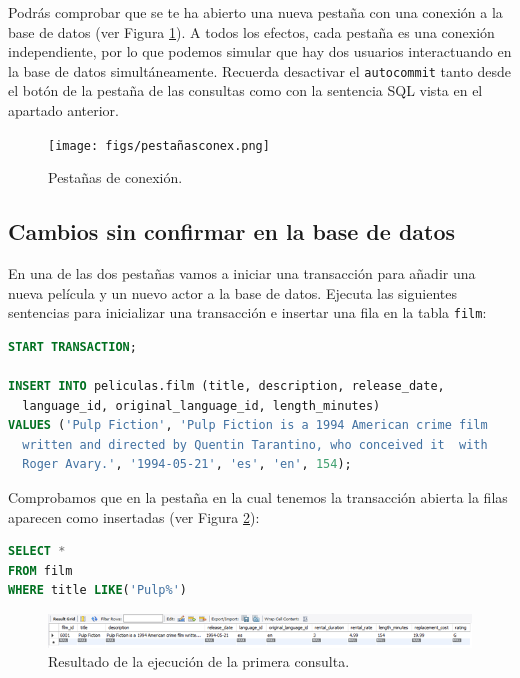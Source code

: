 \documentclass[a4paper]{article}
\begin{document}
Podrás comprobar que se te ha abierto una nueva pestaña con una conexión a la base de datos (ver Figura \ref{fig:pestañas}). A todos los efectos, cada pestaña es una conexión independiente, por lo que podemos simular que hay dos usuarios interactuando en la base de datos simultáneamente. Recuerda desactivar el \texttt{autocommit} tanto desde el botón de la pestaña de las consultas como con la sentencia SQL vista en el apartado anterior.

\begin{figure}[ht]
    \centering
    \texttt{[image: figs/pestañasconex.png]}
    \caption{Pestañas de conexión.}\label{fig:pestañas}
\end{figure}

\subsection*{Cambios sin confirmar en la base de datos}

En una de las dos pestañas vamos a iniciar una transacción para añadir una nueva película y un nuevo actor a la base de datos. Ejecuta las siguientes sentencias para inicializar una transacción e insertar una fila en la tabla \texttt{film}:

\begin{lstlisting}[language=SQL]
START TRANSACTION;

INSERT INTO peliculas.film (title, description, release_date, 
  language_id, original_language_id, length_minutes) 
VALUES ('Pulp Fiction', 'Pulp Fiction is a 1994 American crime film 
  written and directed by Quentin Tarantino, who conceived it  with 
  Roger Avary.', '1994-05-21', 'es', 'en', 154);
\end{lstlisting}

Comprobamos que en la pestaña en la cual tenemos la transacción abierta la filas aparecen como insertadas (ver Figura \ref{fig:1consulta}):

\begin{lstlisting}[language=SQL]
SELECT * 
FROM film
WHERE title LIKE('Pulp%')
\end{lstlisting}

\begin{figure}[ht]
    \centering
    \includegraphics[width=0.9\columnwidth]{figs/1consulta.png}
    \caption{Resultado de la ejecución de la primera consulta.}\label{fig:1consulta}
\end{figure}
\end{document}
